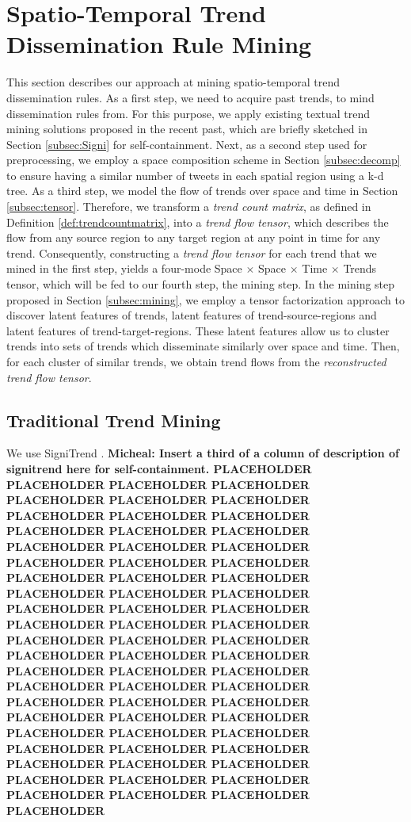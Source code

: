 \section{Spatio-Temporal Trend Dissemination Rule Mining}\label{sec:mining}
This section describes our approach at mining spatio-temporal trend
dissemination rules. As a first step, we need to acquire past trends, to mind
dissemination rules from. For this purpose, we apply existing textual trend
mining solutions proposed in the recent past, which are briefly sketched in
Section \ref{subsec:Signi} for self-containment. Next, as a second step used for
preprocessing, we employ a space composition scheme in Section
\ref{subsec:decomp} to ensure having a similar number of tweets in each spatial
region using a k-d tree.
As a third step, we model the flow of trends over space and time in Section
\ref{subsec:tensor}. Therefore, we transform a \emph{trend count matrix}, as
defined in Definition \ref{def:trendcountmatrix}, into a \emph{trend flow
tensor}, which describes the flow from any source region to any target region at any
point in time for any trend. Consequently, constructing a \emph{trend flow
tensor} for each trend that we mined in the first step, yields a four-mode Space
$\times$ Space $\times$ Time $\times$ Trends tensor, which will be fed to our
fourth step, the mining step. In the mining step proposed in Section
\ref{subsec:mining}, we employ a tensor factorization approach to discover
latent features of trends, latent features of trend-source-regions and latent
features of trend-target-regions. These latent features allow us to cluster
trends into sets of trends which disseminate similarly over space and time.
Then, for each cluster of similar trends, we obtain trend flows from the
\emph{reconstructed trend flow tensor}.

\subsection{Traditional Trend Mining}
We use SigniTrend \cite{schubert2014signitrend}. {\bf Micheal: Insert a third of
a column of description of signitrend here for self-containment. PLACEHOLDER
PLACEHOLDER PLACEHOLDER PLACEHOLDER PLACEHOLDER PLACEHOLDER PLACEHOLDER
PLACEHOLDER PLACEHOLDER PLACEHOLDER PLACEHOLDER PLACEHOLDER PLACEHOLDER
PLACEHOLDER PLACEHOLDER PLACEHOLDER PLACEHOLDER PLACEHOLDER PLACEHOLDER
PLACEHOLDER PLACEHOLDER PLACEHOLDER PLACEHOLDER PLACEHOLDER PLACEHOLDER
PLACEHOLDER PLACEHOLDER PLACEHOLDER PLACEHOLDER PLACEHOLDER PLACEHOLDER
PLACEHOLDER PLACEHOLDER PLACEHOLDER PLACEHOLDER PLACEHOLDER PLACEHOLDER
PLACEHOLDER PLACEHOLDER PLACEHOLDER PLACEHOLDER PLACEHOLDER PLACEHOLDER
PLACEHOLDER PLACEHOLDER PLACEHOLDER PLACEHOLDER PLACEHOLDER PLACEHOLDER
PLACEHOLDER PLACEHOLDER PLACEHOLDER PLACEHOLDER PLACEHOLDER PLACEHOLDER
PLACEHOLDER PLACEHOLDER PLACEHOLDER PLACEHOLDER PLACEHOLDER PLACEHOLDER
PLACEHOLDER PLACEHOLDER PLACEHOLDER PLACEHOLDER }


